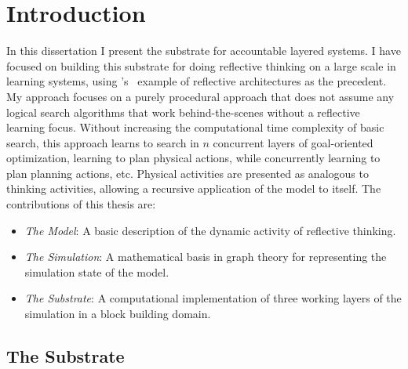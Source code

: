 \chapter{Introduction}
\label{chapter:introduction}

In this dissertation I present the substrate for accountable layered
systems.  I have focused on building this substrate for doing
reflective thinking on a large scale in learning systems, using
{\mbox{\citeauthor{singh:2005b}'s~\citeyearpar{singh:2005b}}} example
of reflective architectures as the precedent.  My approach focuses on
a purely procedural approach that does not assume any logical search
algorithms that work behind-the-scenes without a reflective learning
focus.  Without increasing the computational time complexity of basic
search, this approach learns to search in $n$ concurrent layers of
goal-oriented optimization, learning to plan physical actions, while
concurrently learning to plan planning actions, etc.  Physical
activities are presented as analogous to thinking activities, allowing
a recursive application of the model to itself.  The contributions of
this thesis are:

\begin{itemize}
\item \emph{The Model}: A basic description of the dynamic activity of
  reflective thinking.
\item \emph{The Simulation}: A mathematical basis in graph theory for
  representing the simulation state of the model.
\item \emph{The Substrate}: A computational implementation of three
  working layers of the simulation in a block building domain.
\end{itemize}
  
\section{The Substrate}

